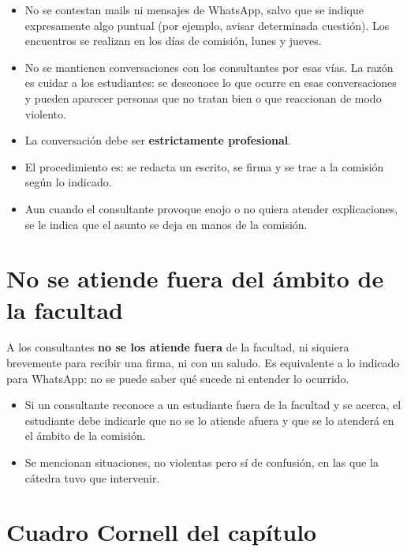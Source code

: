 \documentclass[12pt,oneside]{book}
\begin{document}
\begin{itemize}
    \item No se contestan mails ni mensajes de WhatsApp, salvo que se indique expresamente algo puntual (por ejemplo, avisar determinada cuestión). Los encuentros se realizan en los días de comisión, lunes y jueves.
    \item No se mantienen conversaciones con los consultantes por esas vías. La razón es cuidar a los estudiantes: se desconoce lo que ocurre en esas conversaciones y pueden aparecer personas que no tratan bien o que reaccionan de modo violento.
    \item La conversación debe ser \textbf{estrictamente profesional}.
    \item El procedimiento es: se redacta un escrito, se firma y se trae a la comisión según lo indicado.
    \item Aun cuando el consultante provoque enojo o no quiera atender explicaciones, se le indica que el asunto se deja en manos de la comisión.
\end{itemize}

\section{No se atiende fuera del ámbito de la facultad}

A los consultantes \textbf{no se los atiende fuera} de la facultad, ni siquiera brevemente para recibir una firma, ni con un saludo. Es equivalente a lo indicado para WhatsApp: no se puede saber qué sucede ni entender lo ocurrido.

\begin{itemize}
    \item Si un consultante reconoce a un estudiante fuera de la facultad y se acerca, el estudiante debe indicarle que no se lo atiende afuera y que se lo atenderá en el ámbito de la comisión.
    \item Se mencionan situaciones, no violentas pero sí de confusión, en las que la cátedra tuvo que intervenir.
\end{itemize}

\section{Cuadro Cornell del capítulo}
\end{document}
